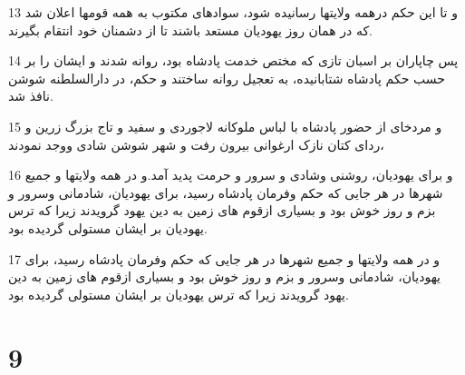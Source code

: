 \par 13 و تا این حکم درهمه ولایتها رسانیده شود، سوادهای مکتوب به همه قومها اعلان شد که در همان روز یهودیان مستعد باشند تا از دشمنان خود انتقام بگیرند.
\par 14 پس چاپاران بر اسبان تازی که مختص خدمت پادشاه بود، روانه شدند و ایشان را بر حسب حکم پادشاه شتابانیده، به تعجیل روانه ساختند و حکم، در دارالسلطنه شوشن نافذ شد.
\par 15 و مردخای از حضور پادشاه با لباس ملوکانه لاجوردی و سفید و تاج بزرگ زرین و ردای کتان نازک ارغوانی بیرون رفت و شهر شوشن شادی ووجد نمودند،
\par 16 و برای یهودیان، روشنی وشادی و سرور و حرمت پدید آمد.و در همه ولایتها و جمیع شهرها در هر جایی که حکم وفرمان پادشاه رسید، برای یهودیان، شادمانی وسرور و بزم و روز خوش بود و بسیاری ازقوم های زمین به دین یهود گرویدند زیرا که ترس یهودیان بر ایشان مستولی گردیده بود.
\par 17 و در همه ولایتها و جمیع شهرها در هر جایی که حکم وفرمان پادشاه رسید، برای یهودیان، شادمانی وسرور و بزم و روز خوش بود و بسیاری ازقوم های زمین به دین یهود گرویدند زیرا که ترس یهودیان بر ایشان مستولی گردیده بود.
 
\chapter{9}

